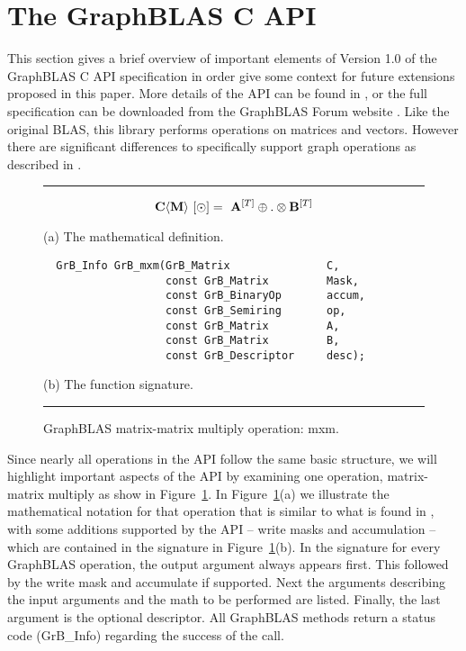 %
%

\renewcommand{\vector}[1]{{\bf #1}}
\renewcommand{\matrix}[1]{{\bf #1}}

\section{The GraphBLAS C API}
\label{sec:GrBCspec}

This section gives a brief overview of important elements 
of Version 1.0 of the GraphBLAS C API specification in order give some context 
for future extensions proposed in this paper.  More details of the API can be 
found in \cite{graphblas_capi_17}, or the full specification can be downloaded 
from the GraphBLAS Forum website \cite{graphblas_web}.  Like the original BLAS, 
this library performs operations on matrices and vectors.  However there are 
significant differences to specifically support graph operations as described 
in \cite{mathgraphblas16}. 

\begin{figure}[b]
\hrule
\label{Fig:mxm}
\footnotesize
\[
\matrix{C}\langle \matrix{M} \rangle ~ [\odot] = ~ \matrix{A}^{[T]} \oplus.\otimes \matrix{B}^{[T]}
\]
\begin{center}(a) The mathematical definition.\end{center}

\begin{verbatim}
  GrB_Info GrB_mxm(GrB_Matrix               C,
                   const GrB_Matrix         Mask,
                   const GrB_BinaryOp       accum,
                   const GrB_Semiring       op,
                   const GrB_Matrix         A, 
                   const GrB_Matrix         B,
                   const GrB_Descriptor     desc);
\end{verbatim}
\begin{center}(b) The function signature.\end{center}
\caption{GraphBLAS matrix-matrix multiply operation: mxm.}
\hrule
\end{figure}

Since nearly all operations in the API follow the same basic structure, we will
highlight important aspects of the API by examining one operation, matrix-matrix
multiply as show in Figure~\ref{Fig:mxm}.  In Figure~\ref{Fig:mxm}(a) we illustrate
the mathematical notation for that operation that is similar to what is found in
\cite{mathgraphblas16}, with some additions supported by the API -- write masks and
accumulation -- which are contained in the signature in Figure~\ref{Fig:mxm}(b).
In the signature for every GraphBLAS operation, the output argument always 
appears first. This followed by the write mask and accumulate if supported. 
Next the arguments describing the input arguments and the math to be performed are
listed. Finally, the last argument is the optional descriptor.  All GraphBLAS methods
return a status code ({\sf GrB\_Info}) regarding the success of the call.

